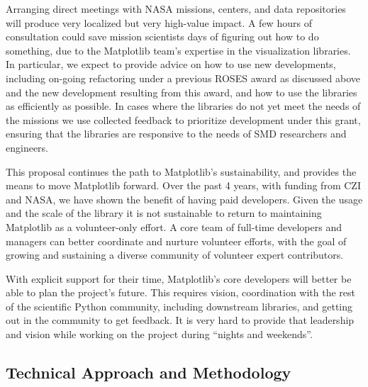 \documentclass[12pt]{article}
\numberwithin{page}{section}
\begin{document}

Arranging direct meetings with NASA missions, centers, and data repositories
will produce very localized but very high-value impact.  A few hours of
consultation could save mission scientists days of figuring out how to do
something, due to the Matplotlib team's expertise in the visualization
libraries.  In particular, we expect to provide advice on how to use new
developments, including on-going refactoring under a previous ROSES award as
discussed above and the new development resulting from this award, and how to
use the libraries as efficiently as possible.  In cases where the libraries do
not yet meet the needs of the missions we use collected feedback to prioritize
development under this grant, ensuring that the libraries are responsive to the
needs of SMD researchers and engineers.

This proposal continues the path to Matplotlib's sustainability, and provides the means to
move Matplotlib forward.  Over the past 4 years, with funding from CZI and NASA, we have
shown the benefit of having paid developers.
Given the usage and the scale of
the library it is not sustainable to return to maintaining Matplotlib as a
volunteer-only effort.  A core team of full-time developers and managers can
better coordinate and nurture volunteer efforts, with the goal of growing and
sustaining a diverse community of volunteer expert contributors.

With explicit support for their time, Matplotlib's core developers
will better be able to plan the project's future.  This requires vision,
coordination with the rest of the scientific Python community, including
downstream libraries, and getting out in the community to get feedback.  It is
very hard to provide that leadership and vision while working on the project during
``nights and weekends''.

\subsection{Technical Approach and Methodology}
\end{document}
